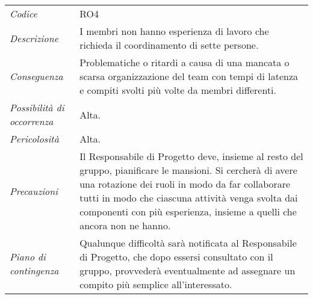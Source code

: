 {{{{{{{{	\begin{center}
		\renewcommand{\arraystretch}{1.4}
		\begin{longtable}{|p{5cm}|p{12cm}|}
			\hline
			\rowcolor{airforceblue}
			\multicolumn{2}{|c|}{\textit{Inesperienza nel coordinamento}}\\
			\hline
			\textit{Codice} & RO4 \\
			\hline
			\textit{Descrizione} & I membri non hanno esperienza di lavoro che richieda il coordinamento di sette persone.\\
			\hline
			\textit{Conseguenza} & Problematiche o ritardi a causa di una mancata o scarsa organizzazione del team con tempi di latenza e compiti svolti più volte da membri differenti. \\
			\hline
			\textit{Possibilità di occorrenza} & Alta. \\
			\hline
			\textit{Pericolosità} & Alta. \\
			\hline
			\textit{Precauzioni} & Il Responsabile di Progetto deve, insieme al resto del gruppo, pianificare le mansioni. Si cercherà di avere una rotazione dei ruoli in modo da far collaborare tutti in modo che ciascuna attività venga svolta dai componenti con più esperienza, insieme a quelli che ancora non ne hanno.  \\
			\hline
			\textit{Piano di contingenza} & Qualunque difficoltà sarà notificata al Responsabile di Progetto, che dopo essersi consultato con il gruppo, provvederà eventualmente ad assegnare un compito più semplice all'interessato. \\
			\hline
		\end{longtable}
	\end{center}

\def\tabularxcolumn#1{m{#1}}
{
	
}}}}}}}}}
